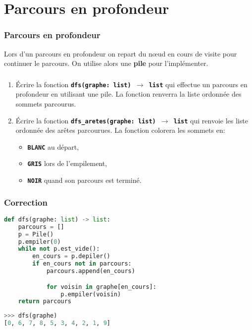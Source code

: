 \documentclass[svgnames,11pt]{beamer}
\begin{document}
\section{Parcours en profondeur}
\begin{frame}
    \frametitle{Parcours en profondeur}

\begin{aretenir}[]
Lors d'un parcours en profondeur on repart du nœud en cours de visite pour continuer le parcours. On utilise alors une \textbf{pile} pour l'implémenter.
\end{aretenir}

\end{frame}
\begin{frame}
    \frametitle{}
\begin{activite}
\begin{enumerate}
    \item Écrire la fonction \textbf{\texttt{dfs(graphe: list) $\rightarrow$ list}} qui effectue un parcours en profondeur en utilisant une pile. La fonction renverra la liste ordonnée des sommets parcourus.
    \item Écrire la fonction \textbf{\texttt{dfs\_aretes(graphe: list) $\rightarrow$ list}} qui renvoie les liste ordonnée des arêtes parcourues. La fonction colorera les sommets en:
    \begin{itemize}
        \item \textbf{\texttt{BLANC}} au départ,
        \item \textbf{\texttt{GRIS}} lors de l'empilement,
        \item \textbf{\texttt{NOIR}} quand son parcours est terminé.
    \end{itemize}
\end{enumerate}
\end{activite}
    

\end{frame}
\begin{frame}[fragile]
    \frametitle{Correction}
\begin{center}
\begin{lstlisting}[language=Python , basicstyle=\ttfamily\small, xleftmargin=2em, xrightmargin=2em]
def dfs(graphe: list) -> list:
    parcours = []
    p = Pile()
    p.empiler(0)
    while not p.est_vide():
        en_cours = p.depiler()
        if en_cours not in parcours:
            parcours.append(en_cours)

            for voisin in graphe[en_cours]:
                p.empiler(voisin)
    return parcours
\end{lstlisting}
\begin{lstlisting}[language=Python , basicstyle=\ttfamily\small, xleftmargin=2em, xrightmargin=2em]
>>> dfs(graphe)
[0, 6, 7, 8, 5, 3, 4, 2, 1, 9]
\end{lstlisting}
\label{CODE}
\end{center}
    

\end{frame}
\end{document}
